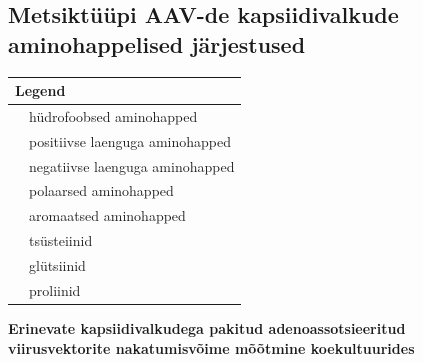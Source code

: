 \documentclass{trkut}%
\begin{document}
\printbibliography

\begin{appendices}

\chapter{Metsiktüüpi AAV-de kapsiidivalkude aminohappelised järjestused}
\label{lisa-jarjestused}

\setlength{\fboxsep}{0pt}
\tiny

\normalsize

\begin{tabular}{ p{0.5cm} p{6cm} }
	\multicolumn{2}{l}{Legend} \\
	\hline
	\colorbox{blue}{\makebox[1.0em]{\phantom{T}}} & hüdrofoobsed aminohapped \\
	\colorbox{red}{\makebox[1.0em]{\phantom{T}}} & positiivse laenguga aminohapped \\
	\colorbox{magenta}{\makebox[1.0em]{\phantom{T}}} & negatiivse laenguga aminohapped \\
	\colorbox{green}{\makebox[1.0em]{\phantom{T}}} & polaarsed aminohapped \\
	\colorbox{cyan}{\makebox[1.0em]{\phantom{T}}} & aromaatsed aminohapped \\
	\colorbox{pink}{\makebox[1.0em]{\phantom{T}}} & tsüsteiinid \\
	\colorbox{orange}{\makebox[1.0em]{\phantom{T}}} & glütsiinid \\
	\colorbox{yellow}{\makebox[1.0em]{\phantom{T}}} & proliinid
\end{tabular}

%

\end{appendices}


\textbf{Erinevate kapsiidivalkudega pakitud adenoassotsieeritud viirusvektorite nakatumisvõime mõõtmine koekultuurides}
\end{document}
